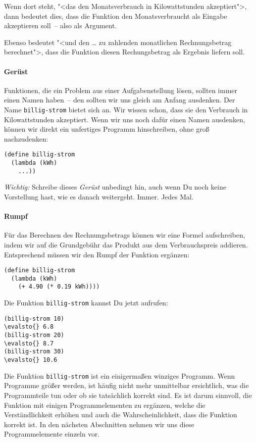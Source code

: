 Wenn dort steht, "<das den Monatsverbrauch in Kilowattstunden
akzeptiert">, dann bedeutet dies, dass die Funktion den
Monatsverbraucht als Eingabe akzeptieren soll~-- also als Argument.

Ebenso bedeutet "<und den \ldots{} zu zahlenden monatlichen
Rechnungsbetrag berechnet">, dass die Funktion diesen Rechungsbetrag
als Ergebnis liefern soll.

\paragraph{Gerüst}

Funktionen, die ein Problem aus einer Aufgabenstellung lösen, sollten
immer einen Namen haben~-- den sollten wir uns gleich am Anfang
ausdenken.  Der Name \lstinline{billig-strom} bietet sich an.  Wir wissen
schon, dass sie den Verbrauch in Kilowattstunden akzeptiert.  Wenn wir
uns noch dafür einen Namen ausdenken, können wir direkt ein unfertiges
Programm hinschreiben, ohne groß nachzudenken:
%
\begin{lstlisting}
(define billig-strom
  (lambda (kWh)
    ...))
\end{lstlisting}
%
\emph{Wichtig:} Schreibe dieses \textit{Gerüst}
unbedingt hin, auch wenn Du noch keine Vorstellung hast, wie es danach
weitergeht.  Immer.  Jedes Mal.

\paragraph{Rumpf}

Für das Berechnen des Rechnungsbetrags können wir eine Formel
aufschreiben, indem wir auf die Grundgebühr das Produkt aus dem
Verbrauchspreis addieren.  Entsprechend müssen wir den Rumpf der
Funktion ergänzen:
%
\begin{lstlisting}
(define billig-strom
  (lambda (kWh)
    (+ 4.90 (* 0.19 kWh))))
\end{lstlisting}
%
Die Funktion \lstinline{billig-strom} kannst Du jetzt aufrufen:
%
\begin{lstlisting}
(billig-strom 10)
\evalsto{} 6.8
(billig-strom 20)
\evalsto{} 8.7
(billig-strom 30)
\evalsto{} 10.6
\end{lstlisting}
%
Die Funktion \lstinline{billig-strom} ist ein einigermaßen winziges
Programm.  Wenn Programme größer werden, ist häufig nicht mehr
unmittelbar ersichtlich, was die Programmteile tun oder ob sie
tatsächlich korrekt sind.  Es ist darum sinnvoll, die Funktion mit
einigen Programmelementen zu ergänzen, welche die Verständlichkeit
erhöhen und auch die Wahrscheinlichkeit, dass die Funktion korrekt
ist.  In den nächsten Abschnitten nehmen wir uns diese
Programmelemente einzeln vor.

